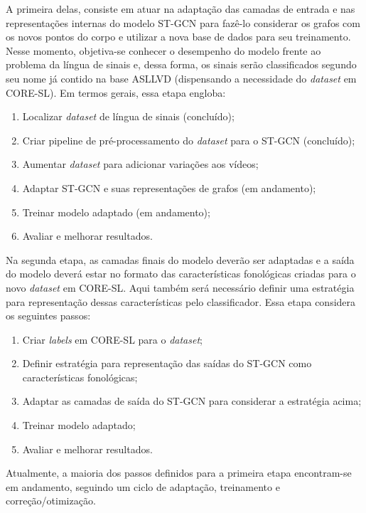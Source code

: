 A primeira delas, consiste em atuar na adaptação das camadas de entrada e nas representações internas do modelo ST-GCN para fazê-lo considerar os grafos com os novos pontos do corpo e utilizar a nova base de dados para seu treinamento. Nesse momento, objetiva-se conhecer o desempenho do modelo frente ao problema da língua de sinais e, dessa forma, os sinais serão classificados segundo seu nome já contido na base ASLLVD (dispensando a necessidade do \textit{dataset} em CORE-SL). Em termos gerais, essa etapa engloba:
\begin{enumerate}
    \item Localizar \textit{dataset} de língua de sinais (concluído);
    \item Criar pipeline de pré-processamento do \textit{dataset} para o ST-GCN (concluído);
    \item Aumentar \textit{dataset} para adicionar variações aos vídeos;
    \item Adaptar ST-GCN e suas representações de grafos (em andamento);
    \item Treinar modelo adaptado (em andamento);
    \item Avaliar e melhorar resultados.
\end{enumerate}

Na segunda etapa, as camadas finais do modelo deverão ser adaptadas e a saída do modelo deverá estar no formato das características fonológicas criadas para o novo \textit{dataset} em CORE-SL. Aqui também será necessário definir uma estratégia para representação dessas características pelo classificador. Essa etapa considera os seguintes passos:
\begin{enumerate}
    \item Criar \textit{labels} em CORE-SL para o \textit{dataset};
    \item Definir estratégia para representação das saídas do ST-GCN como características fonológicas;
    \item Adaptar as camadas de saída do ST-GCN para considerar a estratégia acima;
    \item Treinar modelo adaptado;
    \item Avaliar e melhorar resultados.
\end{enumerate}

Atualmente, a maioria dos passos definidos para a primeira etapa encontram-se em andamento, seguindo um ciclo de adaptação, treinamento e correção/otimização.






